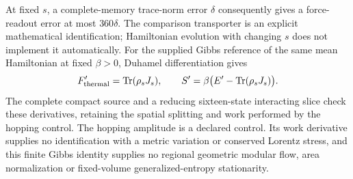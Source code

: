 At fixed $s$, a complete-memory trace-norm error $\delta$ consequently
gives a force-readout error at most $360\delta$.
The comparison transporter is an explicit mathematical identification;
Hamiltonian evolution with changing $s$ does not implement it automatically.
For the supplied Gibbs reference of the same mean Hamiltonian at fixed
$\beta>0$, Duhamel differentiation gives
\[
 F'_{\rm thermal}=\operatorname{Tr}(\rho_sJ_s),\qquad
 S'=\beta\bigl(E'-\operatorname{Tr}(\rho_sJ_s)\bigr).
\]
The complete compact source and a reducing sixteen-state interacting slice
check these derivatives, retaining the spatial splitting and work performed
by the hopping control.
The hopping amplitude is a declared control. Its work derivative supplies
no identification with a metric variation or conserved Lorentz stress,
and this finite Gibbs identity supplies no regional geometric modular flow,
area normalization or fixed-volume generalized-entropy stationarity.
